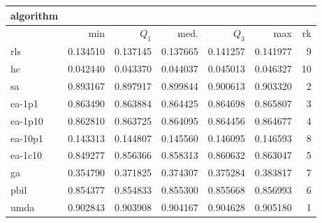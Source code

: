\begin{tabular}{@{}l*{5}{>{{}}N{1}{3}}>{{}}N{2}{0}@{}}
\toprule
{algorithm} &  \\
\midrule
& {min} & {$Q_1$} & {med.} & {$Q_3$} & {max} & {rk}\\
\midrule
rls & 0.134510 & 0.137145 & 0.137665 & 0.141257 & 0.141977 & 9\\
hc & 0.042440 & 0.043370 & 0.044037 & 0.045013 & 0.046327 & 10\\
sa & 0.893167 & 0.897917 & 0.899844 & 0.900613 & 0.903320 & 2\\
ea-1p1 & 0.863490 & 0.863884 & 0.864425 & 0.864698 & 0.865807 & 3\\
ea-1p10 & 0.862810 & 0.863725 & 0.864095 & 0.864456 & 0.864677 & 4\\
ea-10p1 & 0.143313 & 0.144807 & 0.145560 & 0.146095 & 0.146593 & 8\\
ea-1c10 & 0.849277 & 0.856366 & 0.858313 & 0.860632 & 0.863047 & 5\\
ga & 0.354790 & 0.371825 & 0.374307 & 0.375284 & 0.383817 & 7\\
pbil & 0.854377 & 0.854833 & 0.855300 & 0.855668 & 0.856993 & 6\\
umda & {\color{blue}} 0.902843 & {\color{blue}} 0.903908 & {\color{blue}} 0.904167 & {\color{blue}} 0.904628 & {\color{blue}} 0.905180 & 1\\
\bottomrule
\end{tabular}
